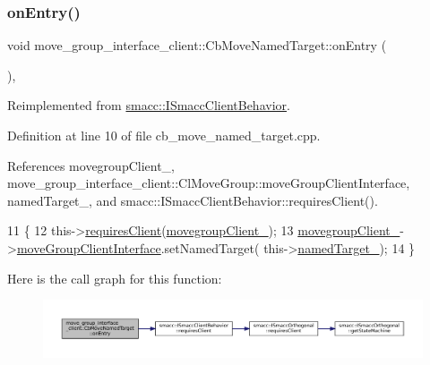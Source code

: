 \subsubsection{\texorpdfstring{on\+Entry()}{onEntry()}}
{\footnotesize\ttfamily void move\+\_\+group\+\_\+interface\+\_\+client\+::\+Cb\+Move\+Named\+Target\+::on\+Entry (\begin{DoxyParamCaption}{ }\end{DoxyParamCaption})\hspace{0.3cm}{\ttfamily [override]}, {\ttfamily [virtual]}}



Reimplemented from \hyperlink{classsmacc_1_1ISmaccClientBehavior_a3ec24a839087c550e1d62a81e48cf530}{smacc\+::\+I\+Smacc\+Client\+Behavior}.



Definition at line 10 of file cb\+\_\+move\+\_\+named\+\_\+target.\+cpp.



References movegroup\+Client\+\_\+, move\+\_\+group\+\_\+interface\+\_\+client\+::\+Cl\+Move\+Group\+::move\+Group\+Client\+Interface, named\+Target\+\_\+, and smacc\+::\+I\+Smacc\+Client\+Behavior\+::requires\+Client().


\begin{DoxyCode}
11 \{
12     this->\hyperlink{classsmacc_1_1ISmaccClientBehavior_a32b16e99e3b4cb289414203dc861a440}{requiresClient}(\hyperlink{classmove__group__interface__client_1_1CbMoveNamedTarget_acd7b16a1c38b103c0624fad1dfd99176}{movegroupClient\_});
13     \hyperlink{classmove__group__interface__client_1_1CbMoveNamedTarget_acd7b16a1c38b103c0624fad1dfd99176}{movegroupClient\_}->\hyperlink{classmove__group__interface__client_1_1ClMoveGroup_a5f0ea9b52695661b17605691168d1f31}{moveGroupClientInterface}.setNamedTarget(
      this->\hyperlink{classmove__group__interface__client_1_1CbMoveNamedTarget_a1e985a12ca30e0c6946a28940504f036}{namedTarget\_});
14 \}
\end{DoxyCode}
Here is the call graph for this function\+:
\nopagebreak
\begin{figure}[H]
\begin{center}
\leavevmode
\includegraphics[width=350pt]{classmove__group__interface__client_1_1CbMoveNamedTarget_afe138151340dafa14cb88051e82f0c8e_cgraph}
\end{center}
\end{figure}
\mbox{\label{classmove__group__interface__client_1_1CbMoveNamedTarget_a239d351bb9c2b579cc19ee993c792d2d}} 
